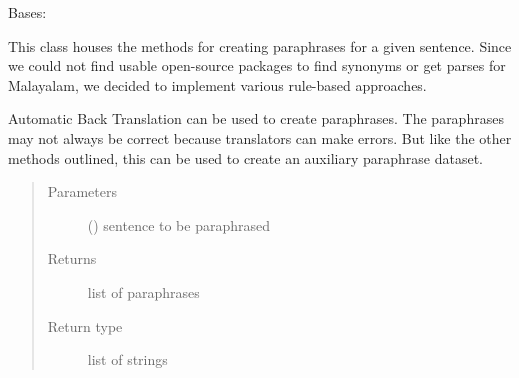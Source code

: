 \documentclass[letterpaper,10pt,english]{sphinxmanual}
\begin{document}
\begin{fulllineitems}
\label{\detokenize{ParaphraseDatasetCreation.Malayalam:ParaphraseDatasetCreation.Malayalam.Positive.PositiveParaphrases}}
Bases: 

This class houses the methods for creating paraphrases for a given
sentence. Since we could not find usable open-source packages to find 
synonyms or get parses for Malayalam, we decided to implement various
rule-based approaches.

\begin{fulllineitems}
\label{\detokenize{ParaphraseDatasetCreation.Malayalam:ParaphraseDatasetCreation.Malayalam.Positive.PositiveParaphrases.back_translation}}
Automatic Back Translation can be used to create paraphrases. The 
paraphrases may not always be correct because translators can make errors. 
But like the other methods outlined, this can be used to create an auxiliary
paraphrase dataset.
\begin{quote}\begin{description}
\item[{Parameters}] \leavevmode
{} () \textendash{} sentence to be paraphrased

\item[{Returns}] \leavevmode
list of paraphrases

\item[{Return type}] \leavevmode
list of strings

\end{description}\end{quote}

\end{fulllineitems}



\end{fulllineitems}
\end{document}
